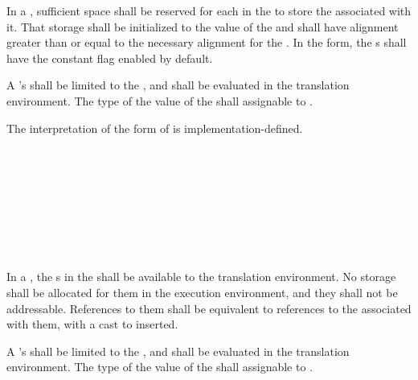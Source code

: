 \specsubsubitem
In a , sufficient space shall be reserved for
each  in the  to store
the  associated with it. That storage shall be initialized to
the value of the  and shall have alignment
greater than or equal to the necessary alignment for the . In
the  form, the s shall have the constant flag
enabled by default.

\specsubsubitem
A 's  shall be
limited to the , and shall be
evaluated in the translation environment. The type of the value of the
 shall assignable to .

\specsubsubitem
The interpretation of the  form of  is
implementation-defined.


\begin{grammar}
 \\
	  \\

 \\
	 \optional{\terminal{,}} \\
	 \terminal{,}  \\

 \\
	 \terminal{:}  \terminal{=}  \\
\end{grammar}

\specsubsubitem
In a , the s in the
 shall be available to the translation
environment. No storage shall be allocated for them in the execution
environment, and they shall not be addressable. References to them shall be
equivalent to references to the  associated with
them, with a cast to  inserted.

\specsubsubitem
A 's  shall be
limited to the , and shall be
evaluated in the translation environment. The type of the value of the
 shall assignable to .

